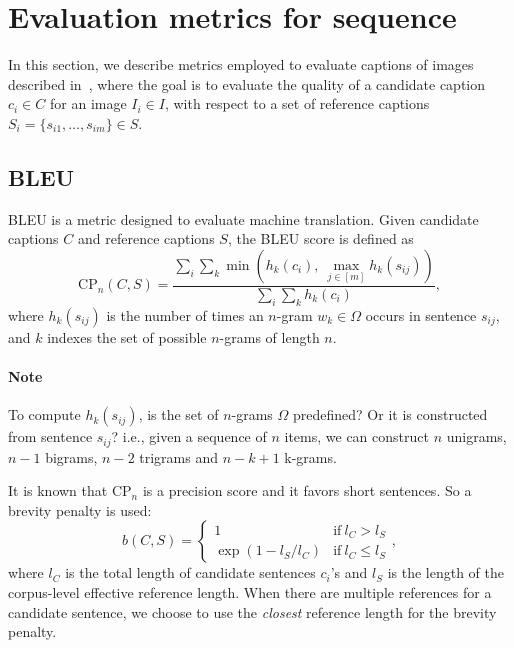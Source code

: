 \section{Evaluation metrics for sequence}

In this section, we describe metrics employed to evaluate captions of images described in~\cite{chen2015microsoft},
where the goal is to evaluate the quality of a candidate caption $c_i \in C$ for an image $I_i \in I$, 
with respect to a set of reference captions $S_i = \{s_{i1},\dots,s_{im}\} \in S$.

\subsection{BLEU}
BLEU is a metric designed to evaluate machine translation.
Given candidate captions $C$ and reference captions $S$, the BLEU score is defined as
\begin{equation*}
\text{CP}_n(C, S) =
\frac{\sum_i \sum_k \min\left( h_k(c_i),~ \max_{j \in [m]} h_k(s_{ij}) \right)}
     {\sum_i \sum_k h_k(c_i)},
\end{equation*}
where $h_k(s_{ij})$ is the number of times an $n$-gram $w_k \in \Omega$ occurs in sentence $s_{ij}$,
and $k$ indexes the set of possible $n$-grams of length $n$.

{\it 
\paragraph{Note} 
To compute $h_k(s_{ij})$, is the set of $n$-grams $\Omega$ predefined? Or it is constructed from sentence $s_{ij}$?
i.e., given a sequence of $n$ items, we can construct $n$ unigrams, $n-1$ bigrams, $n-2$ trigrams and $n-k+1$ k-grams. \\
}

\noindent
It is known that CP$_n$ is a precision score and it favors short sentences.
So a brevity penalty is used:
\begin{equation*}
b(C, S) = \begin{cases}
1 & \text{if}~ l_C > l_S \\
\exp(1-l_S/l_C) & \text{if}~ l_C \le l_S
\end{cases},
\end{equation*}
where $l_C$ is the total length of candidate sentences $c_i$'s and $l_S$ is the length of the corpus-level effective reference length.
When there are multiple references for a candidate sentence, we choose to use the \textit{closest} reference length for the brevity penalty.

